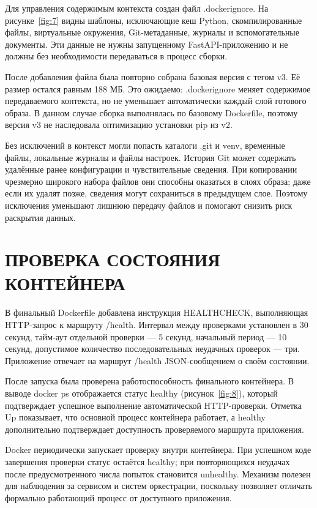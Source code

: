 \documentclass[14pt,a4paper]{extarticle}
\begin{document}
Для управления содержимым контекста создан файл .dockerignore. На рисунке~\ref{fig:7} видны шаблоны, исключающие кеш Python, скомпилированные файлы, виртуальные окружения, Git-метаданные, журналы и вспомогательные документы. Эти данные не нужны запущенному FastAPI-приложению и не должны без необходимости передаваться в процесс сборки.

После добавления файла была повторно собрана базовая версия с тегом v3. Её размер остался равным 188 МБ. Это ожидаемо: .dockerignore меняет содержимое передаваемого контекста, но не уменьшает автоматически каждый слой готового образа. В данном случае сборка выполнялась по базовому Dockerfile, поэтому версия v3 не наследовала оптимизацию установки pip из v2.

Без исключений в контекст могли попасть каталоги .git и venv, временные файлы, локальные журналы и файлы настроек. История Git может содержать удалённые ранее конфигурации и чувствительные сведения. При копировании чрезмерно широкого набора файлов они способны оказаться в слоях образа; даже если их удалят позже, сведения могут сохраниться в предыдущем слое. Поэтому исключения уменьшают лишнюю передачу файлов и помогают снизить риск раскрытия данных.

\clearpage
\section{ПРОВЕРКА СОСТОЯНИЯ КОНТЕЙНЕРА}

В финальный Dockerfile добавлена инструкция HEALTHCHECK, выполняющая HTTP-запрос к маршруту /health. Интервал между проверками установлен в 30 секунд, тайм-аут отдельной проверки — 5 секунд, начальный период — 10 секунд, допустимое количество последовательных неудачных проверок — три. Приложение отвечает на маршрут /health JSON-сообщением о своём состоянии.

После запуска была проверена работоспособность финального контейнера. В выводе docker ps отображается статус healthy (рисунок~\ref{fig:8}), который подтверждает успешное выполнение автоматической HTTP-проверки. Отметка Up показывает, что основной процесс контейнера работает, а healthy дополнительно подтверждает доступность проверяемого маршрута приложения.

Docker периодически запускает проверку внутри контейнера. При успешном коде завершения проверки статус остаётся healthy; при повторяющихся неудачах после предусмотренного числа попыток становится unhealthy. Механизм полезен для наблюдения за сервисом и систем оркестрации, поскольку позволяет отличать формально работающий процесс от доступного приложения.
\end{document}

